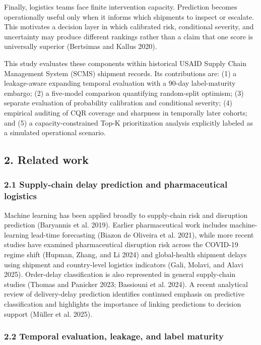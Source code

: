 \documentclass[
]{article}
\begin{document}
Finally, logistics teams face finite intervention capacity. Prediction
becomes operationally useful only when it informs which shipments to
inspect or escalate. This motivates a decision layer in which calibrated
risk, conditional severity, and uncertainty may produce different
rankings rather than a claim that one score is universally superior
(Bertsimas and Kallus 2020).

This study evaluates these components within historical USAID Supply
Chain Management System (SCMS) shipment records. Its contributions are:
(1) a leakage-aware expanding temporal evaluation with a 90-day
label-maturity embargo; (2) a five-model comparison quantifying
random-split optimism; (3) separate evaluation of probability
calibration and conditional severity; (4) empirical auditing of CQR
coverage and sharpness in temporally later cohorts; and (5) a
capacity-constrained Top-K prioritization analysis explicitly labeled as
a simulated operational scenario.

\subsection{2. Related work}\label{related-work}

\subsubsection{2.1 Supply-chain delay prediction and pharmaceutical
logistics}\label{supply-chain-delay-prediction-and-pharmaceutical-logistics}

Machine learning has been applied broadly to supply-chain risk and
disruption prediction (Baryannis et al. 2019). Earlier pharmaceutical
work includes machine-learning lead-time forecasting (Biazon de Oliveira
et al. 2021), while more recent studies have examined pharmaceutical
disruption risk across the COVID-19 regime shift (Hupman, Zhang, and Li
2024) and global-health shipment delays using shipment and country-level
logistics indicators (Gali, Molavi, and Alavi 2025). Order-delay
classification is also represented in general supply-chain studies
(Thomas and Panicker 2023; Bassiouni et al. 2024). A recent analytical
review of delivery-delay prediction identifies continued emphasis on
predictive classification and highlights the importance of linking
predictions to decision support (Müller et al. 2025).

\subsubsection{2.2 Temporal evaluation, leakage, and label
maturity}\label{temporal-evaluation-leakage-and-label-maturity}
\end{document}
